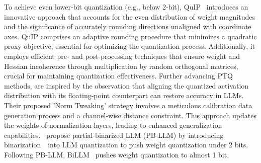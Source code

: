 To achieve even lower-bit quantization (e.g., below 2-bit), QuIP~\citep{chee2023quip} introduces an innovative approach that accounts for the even distribution of weight magnitudes and the significance of accurately rounding directions unaligned with coordinate axes. QuIP comprises an adaptive rounding procedure that minimizes a quadratic proxy objective, essential for optimizing the quantization process. Additionally, it employs efficient pre- and post-processing techniques that ensure weight and Hessian incoherence through multiplication by random orthogonal matrices, crucial for maintaining quantization effectiveness.
Further advancing PTQ methods, \cite{li2023norm} are inspired by the observation that aligning the quantized activation distribution with its floating-point counterpart can restore accuracy in LLMs. Their proposed 'Norm Tweaking' strategy involves a meticulous calibration data generation process and a channel-wise distance constraint. This approach updates the weights of normalization layers, leading to enhanced generalization capabilities.
\citep{shang2024pb}~propose partial-binarized LLM (PB-LLM) by introducing binarization~\citep{hubara2016binarized}~into LLM quantization to push weight quantization under 2 bits. Following PB-LLM, BiLLM~\citep{huang2024billm} pushes weight quantization to almost 1 bit.


